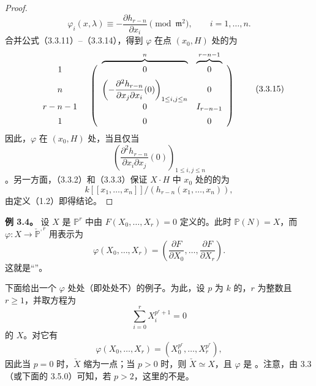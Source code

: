 \begin{proof}
\[\]
\[
\varphi_i(x,\lambda)\equiv-\frac{\partial h_{r-n}}{\partial x_i}\pmod{\mathfrak m^2},\qquad i=1,\ldots,n.
\tag{3.3.14}
\]
合并公式（3.3.11）--（3.3.14），得到 $\varphi$ 在点 $(x_0,H)$ 处的为
\[
\begin{array}{c@{\quad}c}
&\begin{array}{cc}
\overbrace{\hphantom{\left(-\dfrac{\partial^2h_{r-n}}{\partial x_j\partial x_i}(0)\right)_{1\leq i,j\leq n}}}^{n}
&\overbrace{\hphantom{I_{r-n-1}}}^{r-n-1}
\end{array}\\[-3pt]
\begin{array}{c}
1\\[5pt]
n\vphantom{\displaystyle\left(-\frac{\partial^2h_{r-n}}{\partial x_j\partial x_i}(0)\right)_{1\leq i,j\leq n}}\\[5pt]
r-n-1\\[5pt]
1
\end{array}
&\left(\begin{array}{cc}
0&0\\[5pt]
\displaystyle\left(-\frac{\partial^2h_{r-n}}{\partial x_j\partial x_i}(0)\right)_{1\leq i,j\leq n}&0\\[5pt]
0&I_{r-n-1}\\[5pt]
0&0
\end{array}\right)
\end{array}
\tag{3.3.15}
\]
因此，$\varphi$ 在 $(x_0,H)$ 处，当且仅当
\[
\left(\frac{\partial^2h_{r-n}}{\partial x_i\partial x_j}(0)\right)_{1\leq i,j\leq n}
\]
。另一方面，（3.3.2）和（3.3.3）保证 $X\cdot H$ 中 $x_0$ 处的的为
\[
k[[x_1,\ldots,x_n]]/(h_{r-n}(x_1,\ldots,x_n)),\tag{3.3.16}
\]
由定义（1.2）即得结论。
\end{proof}

\textbf{例 3.4。} 设 $X$ 是 $\mathbb P^r$ 中由 $F(X_0,\ldots,X_r)=0$ 定义的。此时 $\mathbb P(N)=X$，而 $\varphi:X\to\check{\mathbb P}^{,r}$ 用表示为
\[
\varphi(X_0,\ldots,X_r)=\left(\frac{\partial F}{\partial X_0},\ldots,\frac{\partial F}{\partial X_r}\right).
\tag{3.4.1}
\]
这就是“”。

下面给出一个 $\varphi$ 处处（即处处不）的例子。为此，设 $p$ 为 $k$ 的，$r$ 为整数且 $r\geq1$，并取方程为
\[
\sum_{i=0}^{r}X_i^{p^r+1}=0\tag{3.4.2}
\]
的 $X$。对它有
\[
\varphi(X_0,\ldots,X_r)=(X_0^{p^r},\ldots,X_r^{p^r}),\tag{3.4.3}
\]
因此当 $p=0$ 时，$\check X$ 缩为一点；当 $p>0$ 时，则 $\check X\simeq X$，且 $\varphi$ 是 。注意，由 3.3（或下面的 3.5.0）可知，若 $p>2$，这里的不是。


